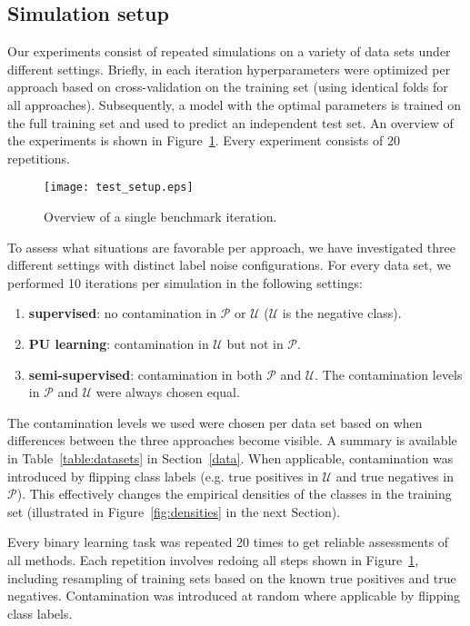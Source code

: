 \documentclass[preprint,elsarticle-num,12pt]{elsarticle}
\begin{document}
\subsection{Simulation setup} 
Our experiments consist of repeated simulations on a variety of data sets under different settings. Briefly, in each iteration hyperparameters were optimized per approach based on cross-validation on the training set (using identical folds for all approaches). Subsequently, a model with the optimal parameters is trained on the full training set and used to predict an independent test set. An overview of the experiments is shown in Figure~\ref{fig:benchmark}. Every experiment consists of 20 repetitions. 

\begin{figure}[!h]
  \centering
  \texttt{[image: test\_setup.eps]}
  \caption{Overview of a single benchmark iteration.} 
  \label{fig:benchmark}
\end{figure}

To assess what situations are favorable per approach, we have investigated three different settings with distinct label noise configurations. For every data set, we performed 10 iterations per simulation in the following settings:
\begin{enumerate}
\item \textbf{supervised}: no contamination in $\mathcal{P}$ or $\mathcal{U}$ ($\mathcal{U}$ is the negative class).
\item \textbf{PU learning}: contamination in $\mathcal{U}$ but not in $\mathcal{P}$. %
\item \textbf{semi-supervised}: contamination in both $\mathcal{P}$ and $\mathcal{U}$. The contamination levels in $\mathcal{P}$ and $\mathcal{U}$ were always chosen equal.
\end{enumerate}

The contamination levels we used were chosen per data set based on when differences between the three approaches become visible. A summary is available in Table~\ref{table:datasets} in Section~\ref{data}. When applicable, contamination was introduced by flipping class labels (e.g. true positives in $\mathcal{U}$ and true negatives in $\mathcal{P}$). This effectively changes the empirical densities of the classes in the training set (illustrated in Figure~\ref{fig:densities} in the next Section).

Every binary learning task was repeated 20 times to get reliable assessments of all methods. Each repetition involves redoing all steps shown in Figure~\ref{fig:benchmark}, including resampling of training sets based on the known true positives and true negatives. Contamination was introduced at random where applicable by flipping class labels.%
\end{document}

